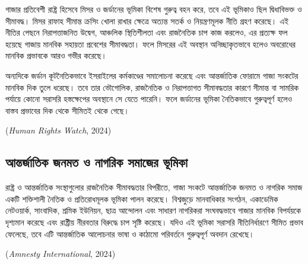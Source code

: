 গাজার প্রতিবেশী রাষ্ট্র হিসেবে মিসর ও জর্ডানের ভূমিকা বিশেষ গুরুত্ব বহন করে, তবে
এই ভূমিকাও ছিল দ্বিধাবিভক্ত ও সীমাবদ্ধ। মিসর রাফাহ সীমান্ত ক্রসিং খোলা রাখার
ক্ষেত্রে অত্যন্ত সতর্ক ও নিয়ন্ত্রণমূলক নীতি গ্রহণ করেছে। এই নীতির পেছনে
নিরাপত্তাজনিত উদ্বেগ, আঞ্চলিক স্থিতিশীলতা এবং রাজনৈতিক চাপ কাজ করলেও, এর
প্রত্যক্ষ ফল হয়েছে গাজায় মানবিক সহায়তা প্রবেশের সীমাবদ্ধতা। ফলে মিসরের এই
অবস্থান অনিচ্ছাকৃতভাবে হলেও অবরোধের মানবিক প্রভাবকে আরও গভীর করেছে।

অন্যদিকে জর্ডান কূটনৈতিকভাবে ইসরাইলের কর্মকাণ্ডের সমালোচনা করেছে এবং
আন্তর্জাতিক ফোরামে গাজা সংকটের মানবিক দিক তুলে ধরেছে। তবে তার ভৌগোলিক,
রাজনৈতিক ও নিরাপত্তাগত সীমাবদ্ধতার কারণে সীমান্ত বা সামরিক পর্যায়ে কোনো
সরাসরি হস্তক্ষেপের অবস্থানে সে যেতে পারেনি। ফলে জর্ডানের ভূমিকা নৈতিকভাবে
গুরুত্বপূর্ণ হলেও বাস্তব প্রভাবের দিক থেকে সীমিতই থেকে গেছে।

(\emph{Human Rights Watch}, 2024)

\vspace{0.3em}

\subsection{আন্তর্জাতিক জনমত ও নাগরিক সমাজের
ভূমিকা}\label{ux986ux9a8ux9a4ux9b0ux99cux9a4ux995-ux99cux9a8ux9aeux9a4-ux993-ux9a8ux997ux9b0ux995-ux9b8ux9aeux99cux9b0-ux9adux9aeux995}

রাষ্ট্র ও আন্তর্জাতিক সংস্থাগুলোর রাজনৈতিক সীমাবদ্ধতার বিপরীতে, গাজা সংকটে
আন্তর্জাতিক জনমত ও নাগরিক সমাজ একটি শক্তিশালী নৈতিক ও প্রতিরোধমূলক ভূমিকা পালন
করেছে। বিশ্বজুড়ে মানবাধিকার সংগঠন, একাডেমিক নেটওয়ার্ক, সাংবাদিক, শ্রমিক
ইউনিয়ন, ছাত্র আন্দোলন এবং সাধারণ নাগরিকরা সংঘবদ্ধভাবে গাজার মানবিক বিপর্যয়কে
দৃশ্যমান করেছে এবং রাষ্ট্রীয় নীরবতার বিরুদ্ধে চাপ সৃষ্টি করেছে। যদিও এই ভূমিকা
সরাসরি নীতিনির্ধারণে সীমিত প্রভাব ফেলেছে, তবে এটি আন্তর্জাতিক আলোচনার ভাষা ও
কাঠামো পরিবর্তনে গুরুত্বপূর্ণ অবদান রেখেছে।

(\emph{Amnesty International}, 2024)

\vspace{0.3em}

